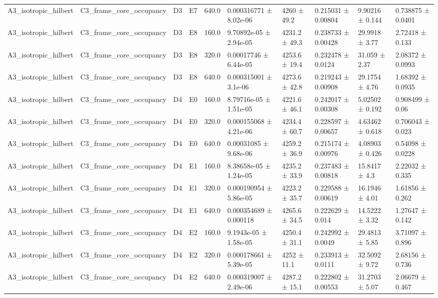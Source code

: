 \begin{table}
\begin{tabular}{llllllllll}
A3\_isotropic\_hilbert & C3\_frame\_core\_occupancy & D3 & E7 & 640.0 & 0.000316771 ± 8.02e-06 & 4260 ± 49.2 & 0.215031 ± 0.00804 & 9.90216 ± 0.144 & 0.738875 ± 0.0401 \\
A3\_isotropic\_hilbert & C3\_frame\_core\_occupancy & D3 & E8 & 160.0 & 9.70892e-05 ± 2.94e-05 & 4231.2 ± 49.3 & 0.238733 ± 0.00428 & 29.9918 ± 3.77 & 2.72418 ± 0.133 \\
A3\_isotropic\_hilbert & C3\_frame\_core\_occupancy & D3 & E8 & 320.0 & 0.00017746 ± 6.44e-05 & 4253.6 ± 19.4 & 0.232478 ± 0.0124 & 31.059 ± 2.37 & 2.08372 ± 0.0993 \\
A3\_isotropic\_hilbert & C3\_frame\_core\_occupancy & D3 & E8 & 640.0 & 0.000315001 ± 3.1e-06 & 4273.6 ± 42.8 & 0.219243 ± 0.00908 & 29.1754 ± 4.76 & 1.68392 ± 0.0935 \\
A3\_isotropic\_hilbert & C3\_frame\_core\_occupancy & D4 & E0 & 160.0 & 8.79716e-05 ± 1.51e-05 & 4221.6 ± 46.1 & 0.242017 ± 0.00308 & 5.02502 ± 0.192 & 0.908499 ± 0.06 \\
A3\_isotropic\_hilbert & C3\_frame\_core\_occupancy & D4 & E0 & 320.0 & 0.000155068 ± 4.21e-06 & 4234.4 ± 60.7 & 0.228597 ± 0.00657 & 4.63462 ± 0.618 & 0.706043 ± 0.023 \\
A3\_isotropic\_hilbert & C3\_frame\_core\_occupancy & D4 & E0 & 640.0 & 0.00031085 ± 9.68e-06 & 4259.2 ± 36.9 & 0.215174 ± 0.00976 & 4.08903 ± 0.426 & 0.54098 ± 0.0228 \\
A3\_isotropic\_hilbert & C3\_frame\_core\_occupancy & D4 & E1 & 160.0 & 8.38658e-05 ± 1.24e-05 & 4235.2 ± 33.9 & 0.237483 ± 0.00818 & 15.8417 ± 4.3 & 2.22032 ± 0.335 \\
A3\_isotropic\_hilbert & C3\_frame\_core\_occupancy & D4 & E1 & 320.0 & 0.000190954 ± 5.86e-05 & 4223.2 ± 35.7 & 0.229588 ± 0.00619 & 16.1946 ± 4.01 & 1.61856 ± 0.262 \\
A3\_isotropic\_hilbert & C3\_frame\_core\_occupancy & D4 & E1 & 640.0 & 0.000354689 ± 0.000118 & 4265.6 ± 34.5 & 0.222629 ± 0.014 & 14.5222 ± 3.32 & 1.27647 ± 0.142 \\
A3\_isotropic\_hilbert & C3\_frame\_core\_occupancy & D4 & E2 & 160.0 & 9.1943e-05 ± 1.58e-05 & 4250.4 ± 31.1 & 0.242992 ± 0.0049 & 29.4813 ± 5.85 & 3.71097 ± 0.896 \\
A3\_isotropic\_hilbert & C3\_frame\_core\_occupancy & D4 & E2 & 320.0 & 0.000178661 ± 5.39e-05 & 4252 ± 11.1 & 0.233913 ± 0.0111 & 32.5092 ± 9.72 & 2.68156 ± 0.736 \\
A3\_isotropic\_hilbert & C3\_frame\_core\_occupancy & D4 & E2 & 640.0 & 0.000319007 ± 2.49e-06 & 4287.2 ± 15.1 & 0.222802 ± 0.00553 & 31.2703 ± 5.07 & 2.06679 ± 0.467 \\

\end{tabular}
\end{table}
